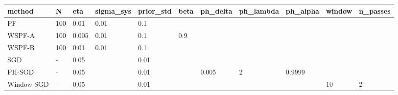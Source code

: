 \begin{tabular}{lllllllllll}
\hline
method & N & eta & sigma\_sys & prior\_std & beta & ph\_delta & ph\_lambda & ph\_alpha & window & n\_passes \\
\hline
PF & 100 & 0.01 & 0.01 & 0.1 &  &  &  &  &  &  \\
WSPF-A & 100 & 0.005 & 0.01 & 0.1 & 0.9 &  &  &  &  &  \\
WSPF-B & 100 & 0.01 & 0.01 & 0.1 &  &  &  &  &  &  \\
SGD & - & 0.05 &  & 0.01 &  &  &  &  &  &  \\
PH-SGD & - & 0.05 &  & 0.01 &  & 0.005 & 2 & 0.9999 &  &  \\
Window-SGD & - & 0.05 &  & 0.01 &  &  &  &  & 10 & 2 \\
\hline
\end{tabular}
